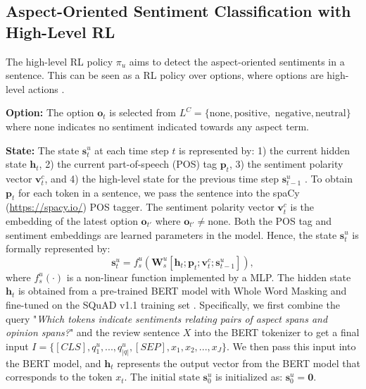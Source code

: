 \documentclass[sigconf]{acmart}
\begin{document}
\subsection{Aspect-Oriented Sentiment Classification with High-Level RL}
The high-level RL policy $\pi_u$ aims to detect the aspect-oriented sentiments in a sentence. This can be seen as a RL policy over options, where options are high-level actions \citep{sutton1999between}.

\textbf{Option:}
The option $\mathrm{\textbf{o}}_t$ is selected from $L^{C} = \{\mathrm{none, positive,}$ $\mathrm{negative, neutral}\}$ where $\mathrm{none}$ indicates no sentiment indicated towards any aspect term.

\textbf{State:}
The state $\mathrm{\textbf{s}}_t^u$ at each time step $t$ is represented by: 1) the current hidden state $\mathrm{\textbf{h}}_t$, 2) the current part-of-speech (POS) tag $\mathrm{\textbf{p}}_t$, 3) the sentiment polarity vector $\mathrm{\textbf{v}}_t^c$, and 4) the high-level state for the previous time step $\mathrm{\textbf{s}}_{t-1}^u$ . To obtain $\mathrm{\textbf{p}}_t$ for each token in a sentence, we pass the sentence into the spaCy (\url{https://spacy.io/}) POS tagger. The sentiment polarity vector $\mathrm{\textbf{v}}_t^c$ is the embedding of the latest option $\mathrm{\textbf{o}}_{t'}$ where $\mathrm{\textbf{o}}_{t'} \neq \mathrm{none}$. Both the POS tag and sentiment embeddings are learned parameters in the model. Hence, the state $\mathrm{\textbf{s}}_t^u$ is formally represented by: 
\begin{equation}
\mathrm{\textbf{s}}_t^u = f^{u}_{s}(\mathrm{\textbf{W}}_s^u[\mathrm{\textbf{h}}_t;\mathrm{\textbf{p}}_t;\mathrm{\textbf{v}}_t^c; \mathrm{\textbf{s}}_{t-1}^{u}]),
\end{equation}
where $f^{u}_{s}(\cdot)$ is a non-linear function implemented by a MLP. The hidden state $\mathrm{\textbf{h}}_t$ is obtained from a pre-trained BERT model \cite{devlin2018bert} with Whole Word Masking and fine-tuned on the SQuAD v1.1 training set \cite{rajpurkar2016squad}. Specifically, we first combine the query "\emph{Which tokens indicate sentiments relating pairs of aspect spans and opinion spans?}" and the review sentence $X$ into the BERT tokenizer to get a final input $I=\{[CLS],q^{u}_{1},...,q^{u}_{|q|},[SEP],x_1,x_2,...,x_J\}$. We then pass this input into the BERT model, and $\mathrm{\textbf{h}}_t$ represents the output vector from the BERT model that corresponds to the token $x_t$. The initial state $\mathrm{\textbf{s}}_{0}^u$ is initialized as: $\mathrm{\textbf{s}}_{0}^u = \textbf{0}$.
\end{document}
